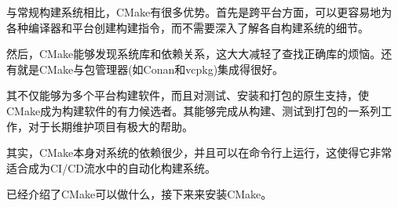 与常规构建系统相比，CMake有很多优势。首先是跨平台方面，可以更容易地为各种编译器和平台创建构建指令，而不需要深入了解各自构建系统的细节。

然后，CMake能够发现系统库和依赖关系，这大大减轻了查找正确库的烦恼。还有就是CMake与包管理器(如Conan和vcpkg)集成得很好。

其不仅能够为多个平台构建软件，而且对测试、安装和打包的原生支持，使CMake成为构建软件的有力候选者。其能够完成从构建、测试到打包的一系列工作，对于长期维护项目有极大的帮助。

其实，CMake本身对系统的依赖很少，并且可以在命令行上运行，这使得它非常适合成为CI/CD流水中的自动化构建系统。

已经介绍了CMake可以做什么，接下来来安装CMake。






















